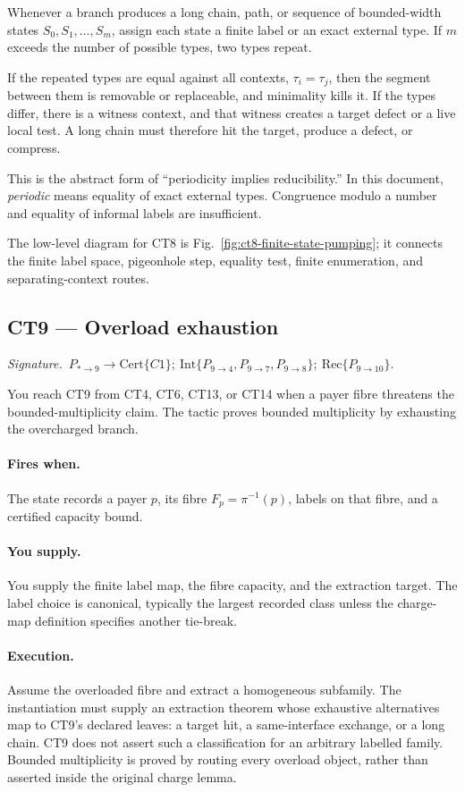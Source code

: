 \documentclass[
  11pt,
]{article}
\theoremstyle{definition}
\newcommand{\ctsignature}[1]{\par\noindent\emph{Signature.}\ #1\par\medskip}
\newcommand{\ctcert}[1]{\mathrm{Cert}\{#1\}}
\newcommand{\ctint}[1]{\mathrm{Int}\{#1\}}
\newcommand{\ctrec}[1]{\mathrm{Rec}\{#1\}}
\newcommand{\ctpar}[1]{\paragraph{#1.}}
\begin{document}
Whenever a branch produces a long chain, path, or sequence of
bounded-width states \(S_0, S_1, \ldots, S_m\), assign each state a
finite label or an exact external type. If \(m\) exceeds the number of
possible types, two types repeat.

If the repeated types are equal against all contexts,
\(\tau_i = \tau_j\), then the segment between them is removable or
replaceable, and minimality kills it. If the types differ, there is a
witness context, and that witness creates a target defect or a live
local test. A long chain must therefore hit the target, produce a
defect, or compress.

This is the abstract form of ``periodicity implies reducibility.'' In
this document, \emph{periodic} means equality of exact external types.
Congruence modulo a number and equality of informal labels are
insufficient.

The low-level diagram for CT8 is Fig.~\ref{fig:ct8-finite-state-pumping};
it connects the finite label space, pigeonhole step, equality test,
finite enumeration, and separating-context routes.



\subsection{CT9 --- Overload exhaustion}\label{ct:9}\label{the-charging-principle-in-general-form}
\ctsignature{\(P_{\ast\to9}\to \ctcert{C1};\ \ctint{P_{9\to4},P_{9\to7},P_{9\to8}};\ \ctrec{P_{9\to10}}\).}

You reach CT9 from CT4, CT6, CT13, or CT14 when a payer fibre threatens
the bounded-multiplicity claim.  The tactic proves bounded multiplicity
by exhausting the overcharged branch.

\ctpar{Fires when}
The state records a payer \(p\), its fibre \(F_p=\pi^{-1}(p)\), labels
on that fibre, and a certified capacity bound.

\ctpar{You supply}
You supply the finite label map, the fibre capacity, and the extraction
target.  The label choice is canonical, typically the largest recorded
class unless the charge-map definition specifies another tie-break.

\ctpar{Execution}
Assume the overloaded fibre and extract a homogeneous subfamily. The
instantiation must supply an extraction theorem whose exhaustive
alternatives map to CT9's declared leaves: a target hit, a same-interface
exchange, or a long chain. CT9 does not assert such a classification for
an arbitrary labelled family. Bounded multiplicity is proved by routing
every overload object, rather than asserted inside the original charge
lemma.
\end{document}
